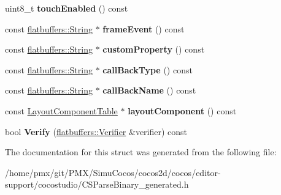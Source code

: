\begin{DoxyCompactItemize}
uint8\+\_\+t {\bfseries touch\+Enabled} () const
\item 
\mbox{\label{structflatbuffers_1_1WidgetOptions_abd72f48f77dab04222180f069f1c45c0}} 
const \hyperlink{structflatbuffers_1_1String}{flatbuffers\+::\+String} $\ast$ {\bfseries frame\+Event} () const
\item 
\mbox{\label{structflatbuffers_1_1WidgetOptions_a59c4c2e434f1c7c8354cb74f9237529d}} 
const \hyperlink{structflatbuffers_1_1String}{flatbuffers\+::\+String} $\ast$ {\bfseries custom\+Property} () const
\item 
\mbox{\label{structflatbuffers_1_1WidgetOptions_ab09983452440a033fe21f2ad6dbc7f8d}} 
const \hyperlink{structflatbuffers_1_1String}{flatbuffers\+::\+String} $\ast$ {\bfseries call\+Back\+Type} () const
\item 
\mbox{\label{structflatbuffers_1_1WidgetOptions_adaa152d9397f0acf689a17d763e2a417}} 
const \hyperlink{structflatbuffers_1_1String}{flatbuffers\+::\+String} $\ast$ {\bfseries call\+Back\+Name} () const
\item 
\mbox{\label{structflatbuffers_1_1WidgetOptions_a451a86dcffba375cd5251e9d57c66c16}} 
const \hyperlink{structflatbuffers_1_1LayoutComponentTable}{Layout\+Component\+Table} $\ast$ {\bfseries layout\+Component} () const
\item 
\mbox{\label{structflatbuffers_1_1WidgetOptions_a17a173bc4cbf520ff655638ac8f5624c}} 
bool {\bfseries Verify} (\hyperlink{classflatbuffers_1_1Verifier}{flatbuffers\+::\+Verifier} \&verifier) const
\end{DoxyCompactItemize}


The documentation for this struct was generated from the following file\+:\begin{DoxyCompactItemize}
\item 
/home/pmx/git/\+P\+M\+X/\+Simu\+Cocos/cocos2d/cocos/editor-\/support/cocostudio/C\+S\+Parse\+Binary\+\_\+generated.\+h\end{DoxyCompactItemize}
